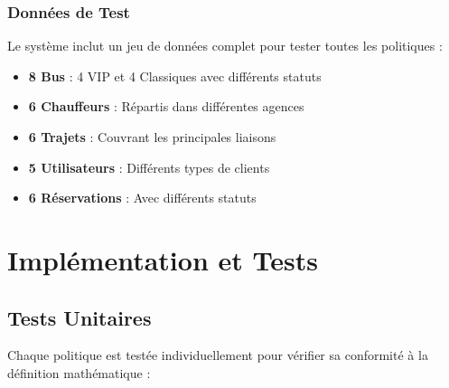 \documentclass[12pt,a4paper]{article}
\begin{document}
    \subsubsection{Données de Test}

    Le système inclut un jeu de données complet pour tester toutes les politiques :

    \begin{itemize}
        \item \textbf{8 Bus} : 4 VIP et 4 Classiques avec différents statuts
        \item \textbf{6 Chauffeurs} : Répartis dans différentes agences
        \item \textbf{6 Trajets} : Couvrant les principales liaisons
        \item \textbf{5 Utilisateurs} : Différents types de clients
        \item \textbf{6 Réservations} : Avec différents statuts
    \end{itemize}

    \newpage

    \section{Implémentation et Tests}

    \subsection{Tests Unitaires}

    Chaque politique est testée individuellement pour vérifier sa conformité à la définition mathématique :
\end{document}
